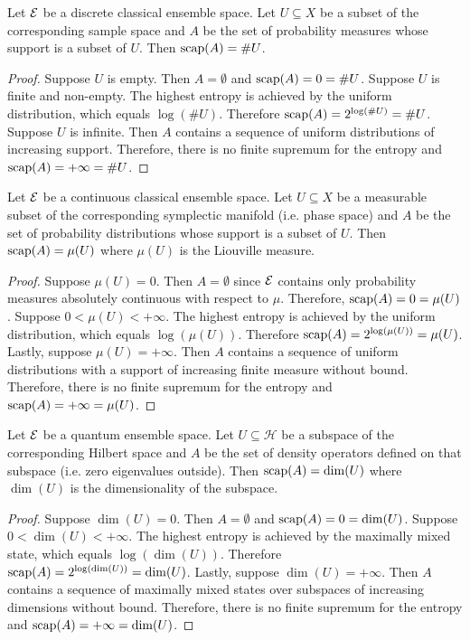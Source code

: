\begin{mathSection}
\begin{prop}
	Let $\mathcal{E}$ be a discrete classical ensemble space. Let  $U \subseteq X$ be a subset of the corresponding sample space and $A$ be the set of probability measures whose support is a subset of $U$. Then $\mathrm{scap}(A) = \#U$.
\end{prop}

\begin{proof}
	Suppose $U$ is empty. Then $A=\emptyset$ and $\mathrm{scap}(A) = 0 = \#U$. Suppose $U$ is finite and non-empty. The highest entropy is achieved by the uniform distribution, which equals $\log (\#U)$. Therefore $\mathrm{scap}(A) = 2^{\log(\#U)} = \#U$. Suppose $U$ is infinite. Then $A$ contains a sequence of uniform distributions of increasing support. Therefore, there is no finite supremum for the entropy and $\mathrm{scap}(A) = +\infty = \#U$.
\end{proof}

\begin{prop}
	Let $\mathcal{E}$ be a continuous classical ensemble space. Let $U \subseteq X$ be a measurable subset of the corresponding symplectic manifold (i.e. phase space) and $A$ be the set of probability distributions whose support is a subset of $U$. Then $\mathrm{scap}(A) = \mu(U)$ where $\mu(U)$ is the Liouville measure.
\end{prop}

\begin{proof}
	Suppose $\mu(U)=0$. Then $A=\emptyset$ since $\mathcal{E}$ contains only probability measures absolutely continuous with respect to $\mu$. Therefore, $\mathrm{scap}(A) = 0 = \mu(U)$. Suppose $0 < \mu(U) < + \infty$. The highest entropy is achieved by the uniform distribution, which equals $\log(\mu(U))$. Therefore $\mathrm{scap}(A) = 2^{\log(\mu(U))} = \mu(U)$. Lastly, suppose $\mu(U) = + \infty$. Then $A$ contains a sequence of uniform distributions with a support of increasing finite measure without bound. Therefore, there is no finite supremum for the entropy and $\mathrm{scap}(A) = +\infty = \mu(U)$.
\end{proof}

\begin{prop}
	Let $\mathcal{E}$ be a quantum ensemble space. Let $U \subseteq \mathcal{H}$ be a subspace of the corresponding Hilbert space and $A$ be the set of density operators defined on that subspace (i.e. zero eigenvalues outside). Then $\mathrm{scap}(A) = \dim(U)$ where $\dim(U)$ is the dimensionality of the subspace.
\end{prop}

\begin{proof}
	Suppose $\dim(U)=0$. Then $A=\emptyset$ and $\mathrm{scap}(A) = 0 = \dim(U)$. Suppose $0 < \dim(U) < + \infty$. The highest entropy is achieved by the maximally mixed state, which equals $\log(\dim(U))$. Therefore $\mathrm{scap}(A) = 2^{\log(\dim(U))} = \dim(U)$.  Lastly, suppose $\dim(U) = + \infty$. Then $A$ contains a sequence of maximally mixed states over subspaces of increasing dimensions without bound. Therefore, there is no finite supremum for the entropy and $\mathrm{scap}(A) = +\infty = \dim(U)$.	
\end{proof}
\end{mathSection}

